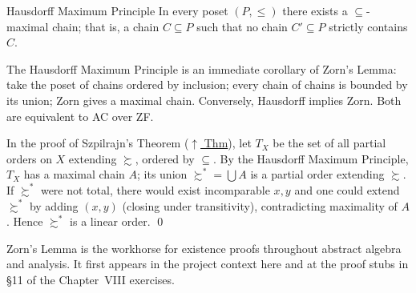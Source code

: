 \begin{theorembox}{Hausdorff Maximum Principle}
\label{thm:hausdorff}
In every poset $(P, \leq)$ there exists a $\subseteq$-maximal chain; that
is, a chain $C \subseteq P$ such that no chain $C' \subseteq P$ strictly
contains $C$.
\end{theorembox}

\begin{remark*}
The Hausdorff Maximum Principle is an immediate corollary of Zorn's Lemma:
take the poset of chains ordered by inclusion; every chain of chains is
bounded by its union; Zorn gives a maximal chain. Conversely, Hausdorff
implies Zorn. Both are equivalent to AC over ZF.
\end{remark*}

\begin{remark*}
In the proof of Szpilrajn's Theorem (\hyperref[thm:szpilrajn]{$\uparrow$ Thm}), let
$T_X$ be the set of all partial orders on $X$ extending $\succsim$, ordered
by $\subseteq$. By the Hausdorff Maximum Principle, $T_X$ has a maximal chain
$A$; its union $\succsim^* = \bigcup A$ is a partial order extending
$\succsim$. If $\succsim^*$ were not total, there would exist incomparable
$x, y$ and one could extend $\succsim^*$ by adding $(x,y)$ (closing under
transitivity), contradicting maximality of $A$. Hence $\succsim^*$ is a
linear order. \qed
\end{remark*}

\begin{remark*}[Transition]
Zorn's Lemma is the workhorse for existence proofs throughout abstract
algebra and analysis. It first appears in the project context here and at
the proof stubs in \S11 of the Chapter~VIII exercises.
\end{remark*}
